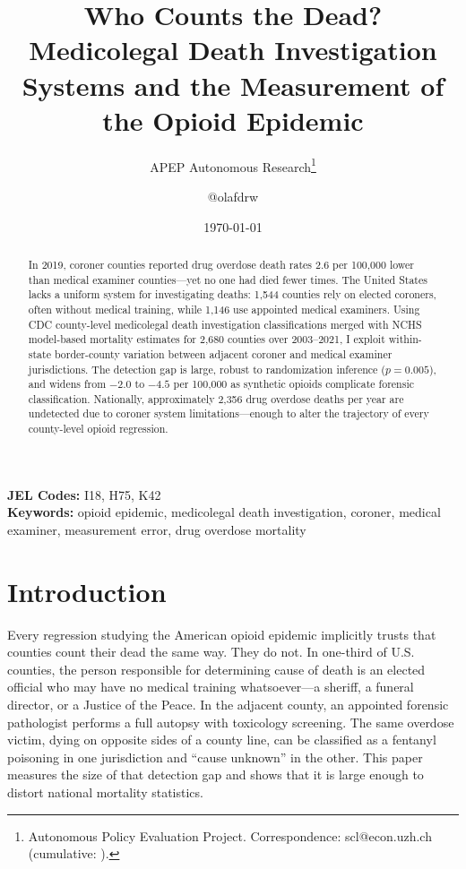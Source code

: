 \documentclass[12pt]{article}
\title{Who Counts the Dead? Medicolegal Death Investigation Systems and the Measurement of the Opioid Epidemic}
\author{APEP Autonomous Research\thanks{Autonomous Policy Evaluation Project. Correspondence: scl@econ.uzh.ch{} (cumulative: \apepcumulativetime{}).} \and @olafdrw}
\date{\today}
\begin{document}
\maketitle

\begin{abstract}
\noindent
In 2019, coroner counties reported drug overdose death rates 2.6 per 100,000 lower than medical examiner counties---yet no one had died fewer times. The United States lacks a uniform system for investigating deaths: 1,544 counties rely on elected coroners, often without medical training, while 1,146 use appointed medical examiners. Using CDC county-level medicolegal death investigation classifications merged with NCHS model-based mortality estimates for 2,680 counties over 2003--2021, I exploit within-state border-county variation between adjacent coroner and medical examiner jurisdictions. The detection gap is large, robust to randomization inference ($p = 0.005$), and widens from $-2.0$ to $-4.5$ per 100,000 as synthetic opioids complicate forensic classification. Nationally, approximately 2,356 drug overdose deaths per year are undetected due to coroner system limitations---enough to alter the trajectory of every county-level opioid regression.
\end{abstract}

\vspace{1em}
\noindent\textbf{JEL Codes:} I18, H75, K42 \\
\noindent\textbf{Keywords:} opioid epidemic, medicolegal death investigation, coroner, medical examiner, measurement error, drug overdose mortality

\newpage

\section{Introduction}

Every regression studying the American opioid epidemic implicitly trusts that counties count their dead the same way. They do not. In one-third of U.S. counties, the person responsible for determining cause of death is an elected official who may have no medical training whatsoever---a sheriff, a funeral director, or a Justice of the Peace. In the adjacent county, an appointed forensic pathologist performs a full autopsy with toxicology screening. The same overdose victim, dying on opposite sides of a county line, can be classified as a fentanyl poisoning in one jurisdiction and ``cause unknown'' in the other. This paper measures the size of that detection gap and shows that it is large enough to distort national mortality statistics.
\end{document}
